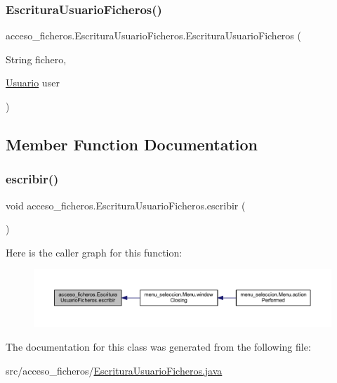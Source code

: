 \subsubsection{\texorpdfstring{Escritura\+Usuario\+Ficheros()}{EscrituraUsuarioFicheros()}}
{\footnotesize\ttfamily acceso\+\_\+ficheros.\+Escritura\+Usuario\+Ficheros.\+Escritura\+Usuario\+Ficheros (\begin{DoxyParamCaption}\item[{String}]{fichero,  }\item[{\mbox{\hyperlink{classclases_1_1_usuario}{Usuario}}}]{user }\end{DoxyParamCaption})}



\subsection{Member Function Documentation}
\mbox{\label{classacceso__ficheros_1_1_escritura_usuario_ficheros_a4e2e757d274f78e6c2bee2f36fc61afd}} 
\subsubsection{\texorpdfstring{escribir()}{escribir()}}
{\footnotesize\ttfamily void acceso\+\_\+ficheros.\+Escritura\+Usuario\+Ficheros.\+escribir (\begin{DoxyParamCaption}{ }\end{DoxyParamCaption})}

Here is the caller graph for this function\+:
\nopagebreak
\begin{figure}[H]
\begin{center}
\leavevmode
\includegraphics[width=350pt]{classacceso__ficheros_1_1_escritura_usuario_ficheros_a4e2e757d274f78e6c2bee2f36fc61afd_icgraph}
\end{center}
\end{figure}


The documentation for this class was generated from the following file\+:\begin{DoxyCompactItemize}
\item 
src/acceso\+\_\+ficheros/\mbox{\hyperlink{_escritura_usuario_ficheros_8java}{Escritura\+Usuario\+Ficheros.\+java}}\end{DoxyCompactItemize}
